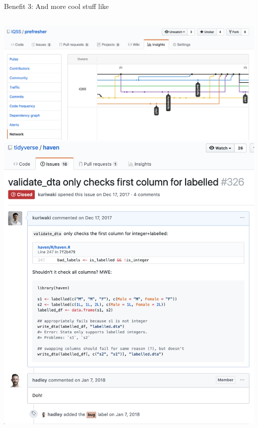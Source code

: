 \documentclass[ignorenonframetext, 10pt, aspectratio=169]{beamer}
\begin{document}
\begin{frame}{Benefit 3: And more cool stuff like}
\begin{columns}[T]
\begin{column}{0.7\textwidth}
 {\includegraphics[width = \linewidth]{prefresher-network.png}}
 {\includegraphics[width = 0.7\linewidth]{file-issues.png}}
\end{column}
\end{columns}
\end{frame}
\end{document}
